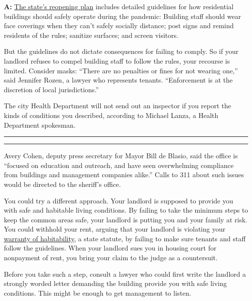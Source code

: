 \textbf{A:}
\href{https://www.governor.ny.gov/sites/governor.ny.gov/files/atoms/files/realestate-masterguidance.pdf}{The
state's reopening plan} includes detailed guidelines for how residential
buildings should safely operate during the pandemic: Building staff
should wear face coverings when they can't safely socially distance;
post signs and remind residents of the rules; sanitize surfaces; and
screen visitors.

But the guidelines do not dictate consequences for failing to comply. So
if your landlord refuses to compel building staff to follow the rules,
your recourse is limited. Consider masks: ``There are no penalties or
fines for not wearing one,'' said Jennifer Rozen, a lawyer who
represents tenants. ``Enforcement is at the discretion of local
jurisdictions.''

The city Health Department will not send out an inspector if you report
the kinds of conditions you described, according to Michael Lanza, a
Health Department spokesman.

\begin{center}\rule{0.5\linewidth}{\linethickness}\end{center}

\begin{center}\rule{0.5\linewidth}{\linethickness}\end{center}

Avery Cohen, deputy press secretary for Mayor Bill de Blasio, said the
office is ``focused on education and outreach, and have seen
overwhelming compliance from buildings and management companies alike.''
Calls to 311 about such issues would be directed to the sheriff's
office.

You could try a different approach. Your landlord is supposed to provide
you with safe and habitable living conditions. By failing to take the
minimum steps to keep the common areas safe, your landlord is putting
you and your family at risk. You could withhold your rent, arguing that
your landlord is violating your
\href{https://nycourts.gov/courts/nyc/housing/pdfs/warrantyofhabitability.pdf}{warranty
of habitability}, a state statute, by failing to make sure tenants and
staff follow the guidelines. When your landlord sues you in housing
court for nonpayment of rent, you bring your claim to the judge as a
countersuit.

Before you take such a step, consult a lawyer who could first write the
landlord a strongly worded letter demanding the building provide you
with safe living conditions. This might be enough to get management to
listen.

